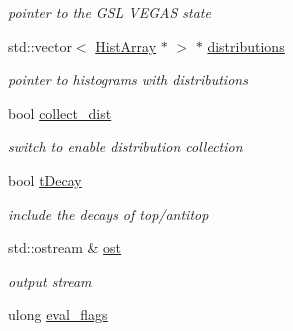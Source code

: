 \begin{DoxyCompactItemize}
\begin{DoxyCompactList}\small\item\em pointer to the G\-S\-L V\-E\-G\-A\-S state \end{DoxyCompactList}\item 
\hypertarget{classintegrand__par_a64a87fc85afba50f419677de01b2c44c}{std\-::vector$<$ \hyperlink{classHistArray}{Hist\-Array} $\ast$ $>$ $\ast$ \hyperlink{classintegrand__par_a64a87fc85afba50f419677de01b2c44c}{distributions}}\label{classintegrand__par_a64a87fc85afba50f419677de01b2c44c}

\begin{DoxyCompactList}\small\item\em pointer to histograms with distributions \end{DoxyCompactList}\item 
\hypertarget{classintegrand__par_a2227f484c28e54b55769b2fe6911a782}{bool \hyperlink{classintegrand__par_a2227f484c28e54b55769b2fe6911a782}{collect\-\_\-dist}}\label{classintegrand__par_a2227f484c28e54b55769b2fe6911a782}

\begin{DoxyCompactList}\small\item\em switch to enable distribution collection \end{DoxyCompactList}\item 
\hypertarget{classintegrand__par_a725bfa73c797c38c5575594d0ff53eb6}{bool \hyperlink{classintegrand__par_a725bfa73c797c38c5575594d0ff53eb6}{t\-Decay}}\label{classintegrand__par_a725bfa73c797c38c5575594d0ff53eb6}

\begin{DoxyCompactList}\small\item\em include the decays of top/antitop \end{DoxyCompactList}\item 
\hypertarget{classintegrand__par_ab817e73577da97cd660ad01761521d3b}{std\-::ostream \& \hyperlink{classintegrand__par_ab817e73577da97cd660ad01761521d3b}{ost}}\label{classintegrand__par_ab817e73577da97cd660ad01761521d3b}

\begin{DoxyCompactList}\small\item\em output stream \end{DoxyCompactList}\item 
\hypertarget{classintegrand__par_adb701c9d21e3b412032dca85ebcde090}{ulong \hyperlink{classintegrand__par_adb701c9d21e3b412032dca85ebcde090}{eval\-\_\-flags}}\label{classintegrand__par_adb701c9d21e3b412032dca85ebcde090}


\end{DoxyCompactItemize}

